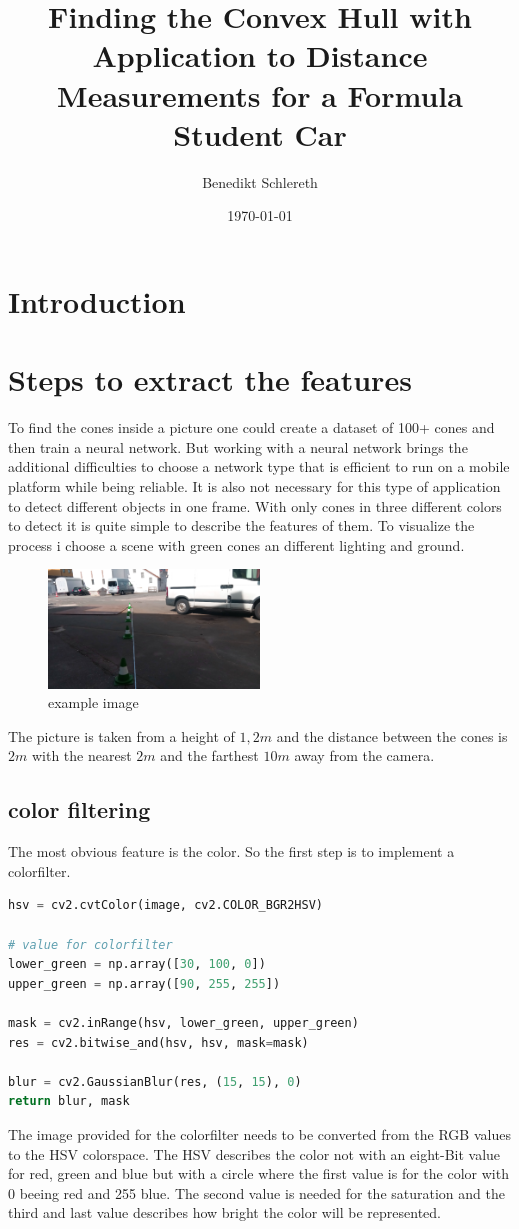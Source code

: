\documentclass[10pt,a4paper]{article}
\title{Finding the Convex Hull with Application to Distance Measurements for a Formula Student Car}
\author{Benedikt Schlereth}
\date{\today}
\begin{document}
	\maketitle
	\tableofcontents
	\pagebreak
	
	\section{Introduction}
	
	
	\section{Steps to extract the features}
	To find the cones inside a picture one could create a dataset of 100+ cones and then train a neural network. But working with a neural network brings the additional difficulties to choose a network type that is efficient to run on a mobile platform while being reliable.
	It is also not necessary for this type of application to detect different objects in one frame.
	With only cones in three different colors to detect it is quite simple to describe the features of them.
	To visualize the process i choose a scene with green cones an different lighting and ground.
	\begin{figure}[h]
		\centering
		\includegraphics[width=0.5\textwidth]{Abb/start.png}
		\caption{example image}
		\label{example image}
	\end{figure}
	The picture is taken from a height of $1,2 m$ and the distance between the cones is $2m$ with the nearest $2m$ and the farthest $10m$ away from the camera.
	 
	\subsection{color filtering}
	The most obvious feature is the color. So the first step is to implement a colorfilter.
	\begin{lstlisting}[language=Python]
hsv = cv2.cvtColor(image, cv2.COLOR_BGR2HSV)
	
# value for colorfilter
lower_green = np.array([30, 100, 0])
upper_green = np.array([90, 255, 255])
	
mask = cv2.inRange(hsv, lower_green, upper_green)
res = cv2.bitwise_and(hsv, hsv, mask=mask)

blur = cv2.GaussianBlur(res, (15, 15), 0)
return blur, mask
	\end{lstlisting}
	The image provided for the colorfilter needs to be converted from the RGB values to the HSV colorspace.
	The HSV describes the color not with an eight-Bit value for red, green and blue but with a circle where the first value is for the color with 0 beeing red and 255 blue.
	The second value is needed for the saturation and the third and last value describes how bright the color will be represented.
	
\end{document}
